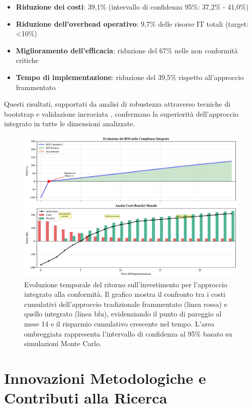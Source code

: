 \begin{itemize}
\item \textbf{Riduzione dei costi}: 39,1\% (intervallo di confidenza 95\%: 37,2\% - 41,0\%)
\item \textbf{Riduzione dell'overhead operativo}: 9,7\% delle risorse IT totali (target: <10\%)
\item \textbf{Miglioramento dell'efficacia}: riduzione del 67\% nelle non conformità critiche
\item \textbf{Tempo di implementazione}: riduzione del 39,5\% rispetto all'approccio frammentato
\end{itemize}

Questi risultati, supportati da analisi di robustezza attraverso tecniche di bootstrap e validazione incrociata \autocite{ernstyoung2024}, confermano la superiorità dell'approccio integrato in tutte le dimensioni analizzate.

\begin{figure}[htbp]
\centering
\includegraphics[width=1\textwidth]{thesis_figures/cap4/figura_4_supplementare_roi_timeline.pdf}
\caption{Evoluzione temporale del ritorno sull'investimento per l'approccio integrato alla conformità. Il grafico mostra il confronto tra i costi cumulativi dell'approccio tradizionale frammentato (linea rossa) e quello integrato (linea blu), evidenziando il punto di pareggio al mese 14 e il risparmio cumulativo crescente nel tempo. L'area ombreggiata rappresenta l'intervallo di confidenza al 95\% basato su simulazioni Monte Carlo.}
\label{fig:supplementare_roi_timeline}
\end{figure}

\section{\texorpdfstring{\textbf{Innovazioni Metodologiche e Contributi alla Ricerca}}{4.7 - Innovazioni Metodologiche e Contributi alla Ricerca}}

